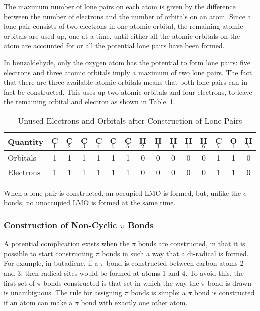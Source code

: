 The maximum number of lone pairs on each atom is given by the difference 
between the number of electrons and the number of orbitals on an atom.   Since
a lone pair consists of two electrons in one atomic orbital, the remaining
atomic orbitals are used up, one at a time, until either all the atomic
orbitals on the atom are accounted for or all the potential lone pairs have
been formed.

In benzaldehyde, only the oxygen atom has the potential to form lone pairs:
five electrons and three atomic orbitals imply a maximum of two lone pairs. The
fact that there are three available atomic orbitals means that both lone pairs
can in fact be constructed.  This uses up two atomic orbitals and four
electrons, to leave the remaining orbital and electron as shown in
Table~\ref{after-lp}.

\begin{table}
\caption{\label{after-lp} Unused Electrons and Orbitals after Construction of
Lone Pairs}
\begin{center}
\begin{tabular}{lcccccccccccccc} \hline
Quantity & C$_1$ & C$_2$ & C$_3$ & C$_4$ & C$_5$ & C$_6$ & H$_2$ & H$_3$ &
H$_4$ & H$_5$ & H$_6$ & C$_7$ & O$_1$ & H$_7$  \\ \hline
Orbitals  & 1 &  1 & 1 & 1 & 1 & 1 & 0 & 0 &  0 &  0 &  0 &  1 & 1 & 0  \\
Electrons & 1 &  1 & 1 & 1 & 1 & 1 & 0 & 0 &  0 &  0 &  0 &  1 & 1 & 0  \\
\hline
\end{tabular}
\end{center}
\end{table}
When a lone pair is constructed, an occupied LMO is formed, but, unlike the
$\sigma$ bonds, no unoccupied LMO is formed at the same time.

\subsubsection{Construction of Non-Cyclic $\pi$ Bonds}
A potential complication exists when the $\pi$ bonds are constructed, in that
it is possible to start constructing $\pi$ bonds in such a way that a
di-radical is formed.  For example, in butadiene, if a $\pi$ bond is
constructed between carbon atoms 2 and 3, then radical sites would be formed at
atoms 1 and 4.  To avoid this, the first set of $\pi$ bonds constructed is that
set in which the way the $\pi$ bond is drawn is unambiguous.  The rule for
assigning  $\pi$ bonds is simple: a $\pi$ bond is constructed if an atom can
make  a $\pi$ bond with exactly one other atom.  

